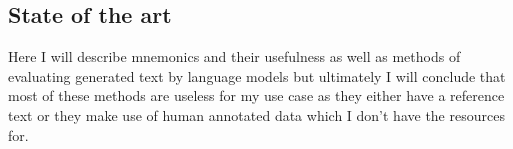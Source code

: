 \subsection{State of the art} \label{sec:body_state_of_the_art}

Here I will describe mnemonics and their usefulness as well as methods of evaluating generated text by language models but ultimately I will conclude that most of these methods are useless for my use case as they either have a reference text or they make use of human annotated data which I don't have the resources for.